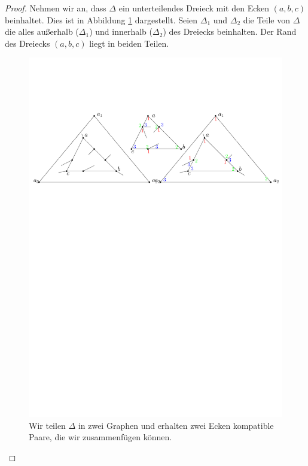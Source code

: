 \begin{proof}
Nehmen wir an, dass $\Delta$ ein unterteilendes Dreieck mit den Ecken $(a,b,c)$ beinhaltet. Dies ist in Abbildung \ref{lem2} dargestellt. Seien $\Delta_1$ und $\Delta_2$ die Teile von $\Delta$ die alles außerhalb ($\Delta_1$) und innerhalb ($\Delta_2$) des Dreiecks beinhalten. Der Rand des Dreiecks $(a,b,c)$ liegt in beiden Teilen.

\begin{figure}
\centering
\includegraphics[width=1\textwidth]{lem2.pdf}
\caption{Wir teilen $\Delta$ in zwei Graphen und erhalten zwei Ecken kompatible Paare, die wir zusammenfügen können.}
\label{lem2}
\centering
\end{figure}


\end{proof}
